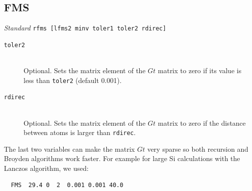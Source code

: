 \documentclass[11pt,oneside]{report} %
\newenvironment{Card}[4]%
      {\vspace{3ex}%
        \subsection{#1}
        \quad\textsl{#3}\newline
        \quad\texttt{#2}\newline%
        \label{card:#4}\\}
      {}
\begin{document}
\begin{Card}{FMS}{rfms  [lfms2 minv toler1 toler2 rdirec]}{Standard}{fms}
\begin{description}
  \item[\texttt{toler2}]\hfill\\ Optional. Sets the matrix element of the $Gt$ matrix
to zero if its value is less than \texttt{toler2} (default 0.001).

  \item[\texttt{rdirec}]\hfill\\ Optional. Sets the matrix element of the $Gt$ matrix
to zero if the distance between atoms is larger than \texttt{rdirec}.
\end{description}
The last two variables can make the matrix $Gt$ very sparse so both recursion
and Broyden algorithms work faster. For example for large Si calculations
with the Lanczos algorithm, we used:
\begin{verbatim}
  FMS  29.4 0  2  0.001 0.001 40.0
\end{verbatim}
\end{Card}
\end{document}
